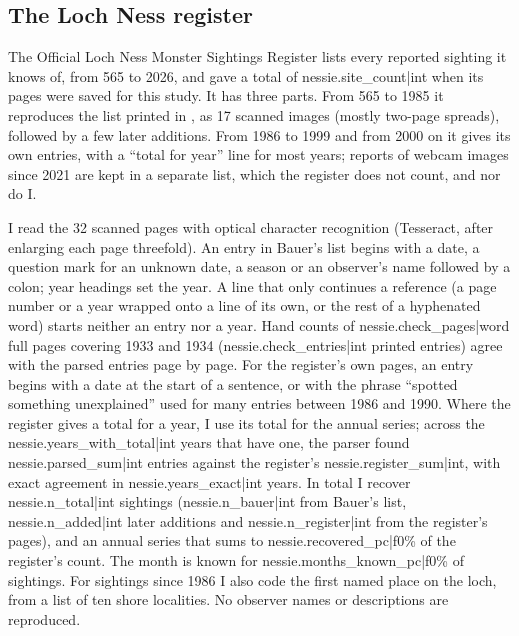 \documentclass[11pt,a4paper]{article}
\begin{document}
\subsection{The Loch Ness register}
The Official Loch Ness Monster Sightings Register \citep{register2026} lists every reported sighting it knows of, from 565 to 2026, and gave a total of {{nessie.site_count|int}} when its pages were saved for this study. It has three parts. From 565 to 1985 it reproduces the list printed in \citet{bauer1986}, as 17 scanned images (mostly two-page spreads), followed by a few later additions. From 1986 to 1999 and from 2000 on it gives its own entries, with a ``total for year'' line for most years; reports of webcam images since 2021 are kept in a separate list, which the register does not count, and nor do I.

I read the 32 scanned pages with optical character recognition (Tesseract, after enlarging each page threefold). An entry in Bauer's list begins with a date, a question mark for an unknown date, a season or an observer's name followed by a colon; year headings set the year. A line that only continues a reference (a page number or a year wrapped onto a line of its own, or the rest of a hyphenated word) starts neither an entry nor a year. Hand counts of {{nessie.check_pages|word}} full pages covering 1933 and 1934 ({{nessie.check_entries|int}} printed entries) agree with the parsed entries page by page. For the register's own pages, an entry begins with a date at the start of a sentence, or with the phrase ``spotted something unexplained'' used for many entries between 1986 and 1990. Where the register gives a total for a year, I use its total for the annual series; across the {{nessie.years_with_total|int}} years that have one, the parser found {{nessie.parsed_sum|int}} entries against the register's {{nessie.register_sum|int}}, with exact agreement in {{nessie.years_exact|int}} years. In total I recover {{nessie.n_total|int}} sightings ({{nessie.n_bauer|int}} from Bauer's list, {{nessie.n_added|int}} later additions and {{nessie.n_register|int}} from the register's pages), and an annual series that sums to {{nessie.recovered_pc|f0}}\% of the register's count. The month is known for {{nessie.months_known_pc|f0}}\% of sightings. For sightings since 1986 I also code the first named place on the loch, from a list of ten shore localities. No observer names or descriptions are reproduced.
\end{document}
